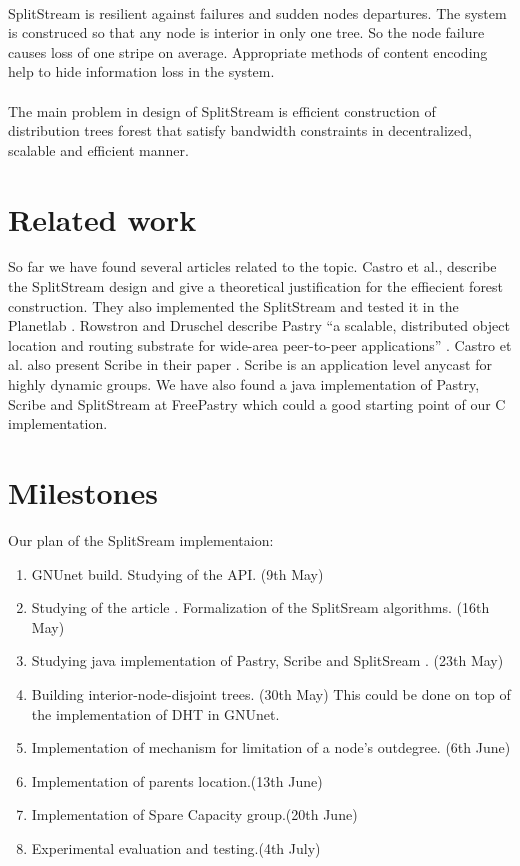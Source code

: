 \documentclass[a4paper,10pt]{article}
\begin{document}
\paragraph{}
SplitStream is resilient against failures and sudden nodes departures. The system is construced so that any node is interior
in only one tree. So the node failure causes loss of one stripe on average. Appropriate methods of content encoding help to
hide information loss in the system.
\paragraph{}
The main problem in design of  SplitStream is efficient construction of distribution trees forest that satisfy bandwidth
constraints in decentralized, scalable and efficient manner.

\section{Related work}
So far we have found several articles related to the topic. Castro et al.\cite{castro1}, \cite{castro2} describe the 
SplitStream design and give a theoretical justification for the effiecient forest construction. They also implemented
the SplitStream and tested it in the Planetlab \cite{Planetlab}. Rowstron and Druschel\cite{Rowstron} describe Pastry
``a scalable, distributed object location and routing substrate for wide-area peer-to-peer applications'' \cite{Rowstron}.
Castro et al. also present Scribe in their paper \cite{castro3}. Scribe is an application level anycast for highly dynamic
groups.
We have also found a java implementation of Pastry, Scribe and 
SplitStream at FreePastry \cite{FreePastry} which could a good starting point of our C implementation.

\section{Milestones}
Our plan of the SplitSream implementaion:
\begin{enumerate}
 \item GNUnet\cite{GNUnet} build. Studying of the API. (9th May)
 \item Studying of the article \cite{castro1}. Formalization of the SplitSream algorithms. (16th May)
 \item Studying java implementation of Pastry, Scribe and SplitSream \cite{FreePastry}. (23th May)
 \item Building interior-node-disjoint trees. (30th May)
 \subitem This could be done on top of the implementation of DHT in GNUnet.
 \item Implementation of mechanism for limitation of a node's outdegree. (6th June)
 \item Implementation of parents location.(13th June)
 \item Implementation of Spare Capacity group.(20th June)
 \item Experimental evaluation and testing.(4th July)
\end{enumerate}

{}

\end{document}
